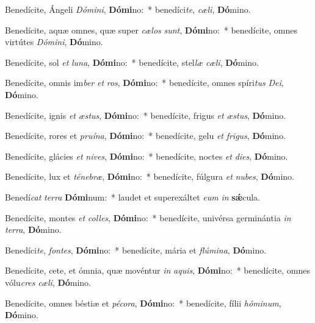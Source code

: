 \item Benedícite, Ángeli \textit{Dó}\textit{mi}\textit{ni}, \textbf{Dó}\textbf{mi}no:~* benedíci\textit{te}, \textit{cæ}\textit{li}, \textbf{Dó}mino.
\item Benedícite, aquæ omnes, quæ super \textit{cæ}\textit{los} \textit{sunt}, \textbf{Dó}\textbf{mi}no:~* benedícite, omnes virtútes \textit{Dó}\textit{mi}\textit{ni}, \textbf{Dó}mino.
\item Benedícite, sol \textit{et} \textit{lu}\textit{na}, \textbf{Dó}\textbf{mi}no:~* benedícite, stel\textit{læ} \textit{cæ}\textit{li}, \textbf{Dó}mino.
\item Benedícite, omnis im\textit{ber} \textit{et} \textit{ros}, \textbf{Dó}\textbf{mi}no:~* benedícite, omnes spíri\textit{tus} \textit{De}\textit{i}, \textbf{Dó}mino.
\item Benedícite, ignis \textit{et} \textit{æs}\textit{tus}, \textbf{Dó}\textbf{mi}no:~* benedícite, frigus \textit{et} \textit{æs}\textit{tus}, \textbf{Dó}mino.
\item Benedícite, rores et \textit{pru}\textit{í}\textit{na}, \textbf{Dó}\textbf{mi}no:~* benedícite, gelu \textit{et} \textit{fri}\textit{gus}, \textbf{Dó}mino.
\item Benedícite, glácies \textit{et} \textit{ni}\textit{ves}, \textbf{Dó}\textbf{mi}no:~* benedícite, noctes \textit{et} \textit{di}\textit{es}, \textbf{Dó}mino.
\item Benedícite, lux et \textit{té}\textit{ne}\textit{bræ}, \textbf{Dó}\textbf{mi}no:~* benedícite, fúlgura \textit{et} \textit{nu}\textit{bes}, \textbf{Dó}mino.
\item Benedí\textit{cat} \textit{ter}\textit{ra} \textbf{Dó}\textbf{mi}num:~* laudet et superexáltet \textit{e}\textit{um} \textit{in} \textbf{sǽ}cula.
\item Benedícite, montes \textit{et} \textit{col}\textit{les}, \textbf{Dó}\textbf{mi}no:~* benedícite, univérsa germinántia \textit{in} \textit{ter}\textit{ra}, \textbf{Dó}mino.
\item Benedíci\textit{te}, \textit{fon}\textit{tes}, \textbf{Dó}\textbf{mi}no:~* benedícite, mária et \textit{flú}\textit{mi}\textit{na}, \textbf{Dó}mino.
\item Benedícite, cete, et ómnia, quæ movéntur \textit{in} \textit{a}\textit{quis}, \textbf{Dó}\textbf{mi}no:~* benedícite, omnes vólu\textit{cres} \textit{cæ}\textit{li}, \textbf{Dó}mino.
\item Benedícite, omnes béstiæ et \textit{pé}\textit{co}\textit{ra}, \textbf{Dó}\textbf{mi}no:~* benedícite, fílii \textit{hó}\textit{mi}\textit{num}, \textbf{Dó}mino.
